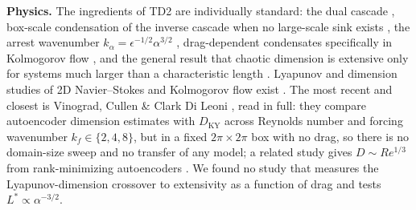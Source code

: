 \documentclass[11pt]{article}
\begin{document}
\textbf{Physics.} The ingredients of TD2 are individually standard: the
dual cascade \cite{kraichnan1967}, box-scale condensation of the inverse
cascade when no large-scale sink exists \cite{smithyakhot1993,chertkov2007},
the arrest wavenumber $k_\alpha=\epsilon^{-1/2}\alpha^{3/2}$
\cite{boffettaecke2012,danilovgurarie2000}, drag-dependent condensates
specifically in Kolmogorov flow \cite{mishra2015}, and the general result
that chaotic dimension is extensive only for systems much larger than a
characteristic length \cite{ruelle1982,egolfgreenside1994,paul2007,karimipaul2010}.
Lyapunov and dimension studies of 2D Navier--Stokes and Kolmogorov flow
exist \cite{grappinleorat1991,plattsirovich1991,chandlerkerswell2013}.
The most recent and closest is Vinograd, Cullen \& Clark Di Leoni
\cite{kolmogorovregimes2026}, read in full: they compare autoencoder
dimension estimates with $D_{\mathrm{KY}}$ across Reynolds number and
forcing wavenumber $k_f\in\{2,4,8\}$, but in a fixed $2\pi\times2\pi$ box
with no drag, so there is no domain-size sweep and no transfer of any
model; a related study gives $D\sim Re^{1/3}$ from rank-minimizing
autoencoders \cite{clearypage2025}. We found no study that measures the
Lyapunov-dimension crossover to extensivity as a function of drag and
tests $L^*\propto\alpha^{-3/2}$.
\end{document}

